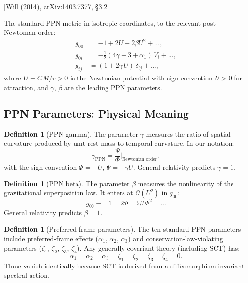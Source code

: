 \documentclass[11pt,a4paper]{article}
\theoremstyle{plain}
\theoremstyle{definition}
\newtheorem{definition}[theorem]{Definition}
\theoremstyle{remark}
\newcommand{\fromlit}[1]{\textcolor{blue!70!black}{\textsf{[#1]}}}
\begin{document}
\fromlit{Will (2014), arXiv:1403.7377, \S3.2}

The standard PPN metric in isotropic coordinates, to the relevant
post-Newtonian order:
\begin{align}
  g_{00} &= -1 + 2U - 2\beta U^2 + \ldots,
  \label{eq:ppn-g00}\\
  g_{0i} &= -\frac{1}{2}(4\gamma + 3 + \alpha_1)\,V_i + \ldots,
  \label{eq:ppn-g0i}\\
  g_{ij} &= (1 + 2\gamma\, U)\,\delta_{ij} + \ldots,
  \label{eq:ppn-gij}
\end{align}
where $U = GM/r > 0$ is the Newtonian potential with sign convention
$U > 0$ for attraction, and $\gamma$, $\beta$ are the leading PPN
parameters.

\subsection{PPN Parameters: Physical Meaning}

\begin{definition}[PPN gamma]\label{def:gamma}
The parameter $\gamma$ measures the ratio of spatial curvature
produced by unit rest mass to temporal curvature.  In our notation:
\begin{equation}\label{eq:gamma-def}
  \gamma_{\mathrm{PPN}} = \frac{\Psi}{\Phi}
  \bigg|_{\text{Newtonian order}},
\end{equation}
with the sign convention $\Phi = -U$, $\Psi = -\gamma U$.
General relativity predicts $\gamma = 1$.
\end{definition}

\begin{definition}[PPN beta]\label{def:beta}
The parameter $\beta$ measures the nonlinearity of the gravitational
superposition law.  It enters at $\mathcal{O}(U^2)$ in $g_{00}$:
\begin{equation}\label{eq:beta-def}
  g_{00} = -1 - 2\Phi - 2\beta\,\Phi^2 + \ldots
\end{equation}
General relativity predicts $\beta = 1$.
\end{definition}

\begin{definition}[Preferred-frame parameters]\label{def:pf}
The ten standard PPN parameters include preferred-frame effects
($\alpha_1$, $\alpha_2$, $\alpha_3$) and conservation-law-violating
parameters ($\zeta_1$, $\zeta_2$, $\zeta_3$, $\zeta_4$).
Any generally covariant theory (including SCT) has:
\begin{equation}\label{eq:pf-zero}
  \alpha_1 = \alpha_2 = \alpha_3 = \zeta_1 = \zeta_2
  = \zeta_3 = \zeta_4 = 0.
\end{equation}
These vanish identically because SCT is derived from a
diffeomorphism-invariant spectral action.
\end{definition}
\end{document}
